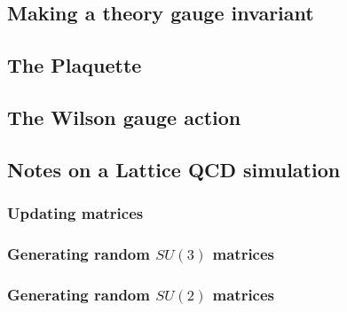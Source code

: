 \subsection{Making a theory gauge invariant}
\subsection{The Plaquette}
\subsection{The Wilson gauge action}
\subsection{Notes on a Lattice QCD simulation}
\subsubsection{Updating matrices}
\subsubsection{Generating random \texorpdfstring{$SU(3)$}{SU3} matrices}
\subsubsection{Generating random \texorpdfstring{$SU(2)$}{SU2} matrices}
